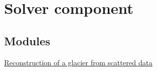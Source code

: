 \hypertarget{group__examples__solver}{
\section{Solver component}
\label{group__examples__solver}
}
\subsection*{Modules}
\begin{CompactItemize}
\item 
\hyperlink{group__examples__solver__glacier}{Reconstruction of a glacier from scattered data}
\end{CompactItemize}
